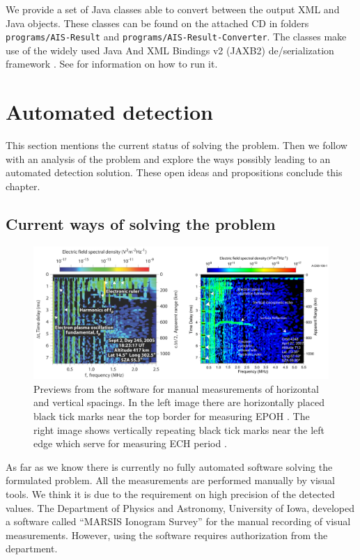 We provide a set of Java classes able to convert between the output XML and Java objects. These classes can be found on the attached CD in folders \texttt{programs/AIS-Result} and \texttt{programs/AIS-Result-Converter}. The classes make use of the widely used Java And XML Bindings v2 (JAXB2) de/serialization framework \citep{Java.net2013}. See  for information on how to run it.

\section{Automated detection}
This section mentions the current status of solving the problem. Then we follow with an analysis of the problem and explore the ways possibly leading to an automated detection solution. These open ideas and propositions conclude this chapter.

\subsection{Current ways of solving the problem}  

\begin{figure}
	\centering
	\includegraphics[width=140mm]{images/rulers.png}
	\caption{Previews from the software for manual measurements of horizontal and vertical spacings. In the left image there are horizontally placed black tick marks near the top border for measuring EPOH \citep{Duru2008}. The right image shows vertically repeating black tick marks near the left edge which serve for measuring ECH period \citep{Akalin2010}.}
	\label{fig:rulers}
\end{figure}

As far as we know there is currently no fully automated software solving the formulated problem. All the measurements are performed manually by visual tools. We think it is due to the requirement on high precision of the detected values. The Department of Physics and Astronomy, University of Iowa, developed a software called ``MARSIS Ionogram Survey'' for the manual recording of visual measurements. However, using the software requires authorization from the department.

